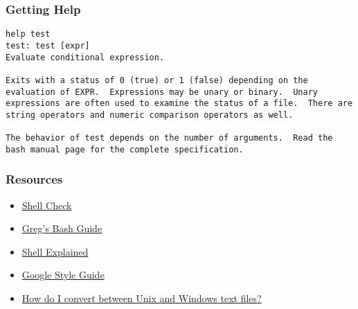 \documentclass[12pt,handout,aspectratio=169]{beamer}
\begin{document}
\begin{frame}[fragile]
  \frametitle{Getting Help}
\begin{verbatim}
help test
test: test [expr]
Evaluate conditional expression.

Exits with a status of 0 (true) or 1 (false) depending on the evaluation of EXPR.  Expressions may be unary or binary.  Unary expressions are often used to examine the status of a file.  There are string operators and numeric comparison operators as well.

The behavior of test depends on the number of arguments.  Read the bash manual page for the complete specification.
\end{verbatim}

\end{frame}
\begin{frame}
  \frametitle{Resources}
  \begin{itemize}
  \item \href{http://www.shellcheck.net/}{Shell Check}
  \item \href{http://mywiki.wooledge.org/BashGuide}{Greg's Bash Guide}
  \item \href{http://explainshell.com/}{Shell Explained}
  \item \href{https://google.github.io/styleguide/shell.xml}{Google Style Guide}
    \item \href{https://kb.iu.edu/d/acux}{How do I convert between Unix and Windows text files?}

    
  \end{itemize}
\end{frame}
\end{document}
